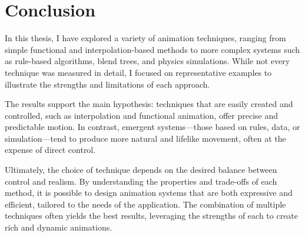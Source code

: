 \pagebreak

\section{Conclusion}
\label{sec:conclusion}

In this thesis, I have explored a variety of animation techniques, ranging from simple functional and interpolation-based methods to more complex systems such as rule-based algorithms, blend trees, and physics simulations. While not every technique was measured in detail, I focused on representative examples to illustrate the strengths and limitations of each approach.

The results support the main hypothesis: techniques that are easily created and controlled, such as interpolation and functional animation, offer precise and predictable motion. In contrast, emergent systems—those based on rules, data, or simulation—tend to produce more natural and lifelike movement, often at the expense of direct control.

Ultimately, the choice of technique depends on the desired balance between control and realism. By understanding the properties and trade-offs of each method, it is possible to design animation systems that are both expressive and efficient, tailored to the needs of the application. The combination of multiple techniques often yields the best results, leveraging the strengths of each to create rich and dynamic animations.
